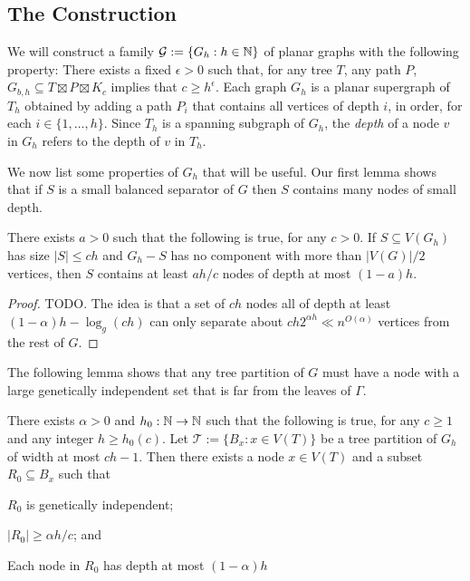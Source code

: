 \documentclass{patmorin}
\newcommand{\defin}[1]{\emph{\color{brightmaroon}#1}}
\begin{document}
\subsection{The Construction}


We will construct a family $\mathcal{G}:=\{G_{h}:h\in\mathbb{N}\}$ of planar graphs with the following property:  There exists a fixed $\epsilon >0$ such that, for any tree $T$, any path $P$, $G_{b,h}\subseteq T\boxtimes P\boxtimes K_c$ implies that $c\ge h^\epsilon$.  Each graph $G_{h}$ is a planar supergraph of $T_h$ obtained by adding a path $P_i$ that contains all vertices of depth $i$, in order, for each $i\in\{1,\ldots,h\}$.   Since $T_h$ is a spanning subgraph of $G_h$, the \defin{depth} of a node $v$ in $G_h$ refers to the depth of $v$ in $T_h$.  

We now list some properties of $G_h$ that will be useful.  
Our first lemma shows that if $S$ is a small balanced separator of $G$ then $S$ contains many nodes of small depth.

\begin{lem}\label{small_depth_separator}
  There exists $a >0$ such that the following is true, for any $c>0$.
  If $S\subseteq V(G_h)$ has size $|S|\le ch$ and $G_h-S$ has no component with more than $|V(G)|/2$ vertices, then $S$ contains at least $ah/c$ nodes of depth at most $(1-a)h$. 
\end{lem}

\begin{proof}
  TODO. The idea is that a set of $ch$ nodes all of depth at least $(1-\alpha)h-\log_g(ch)$ can only separate about $ch2^{\alpha h}\ll n^{O(\alpha)}$ vertices from the rest of $G$.
\end{proof}


The following lemma shows that any tree partition of $G$ must have a node with a large genetically independent set that is far from the leaves of $\Gamma$.

\begin{lem}\label{startup}
  There exists $\alpha >0$ and $h_0:\mathbb{N}\to\mathbb{N}$ such that the following is true, for any $c\ge 1$ and any integer $h\ge h_0(c)$.  Let $\mathcal{T}:=\{B_x:x\in V(T)\}$ be a tree partition of $G_h$ of width at most $ch-1$.  Then there exists a node $x\in V(T)$ and a subset $R_0\subseteq B_x$ such that
  \begin{compactenum}[(i)]
    \item $R_0$ is genetically independent;
    \item $|R_0|\ge \alpha h/c$; and
    \item Each node in $R_0$ has depth at most $(1-\alpha)h$ 
  \end{compactenum}
\end{lem}
\end{document}

